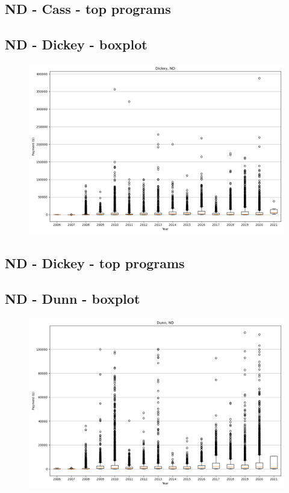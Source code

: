 \subsection*{ND - Cass - top programs}

\newpage
\subsection*{ND - Dickey - boxplot}
\begin{figure}[h]
\centering
\includegraphics[width=7in]{../output/boxplots/counties/Dickey-ND_boxplot.png}
\end{figure}


\subsection*{ND - Dickey - top programs}

\newpage
\subsection*{ND - Dunn - boxplot}
\begin{figure}[h]
\centering
\includegraphics[width=7in]{../output/boxplots/counties/Dunn-ND_boxplot.png}
\end{figure}


